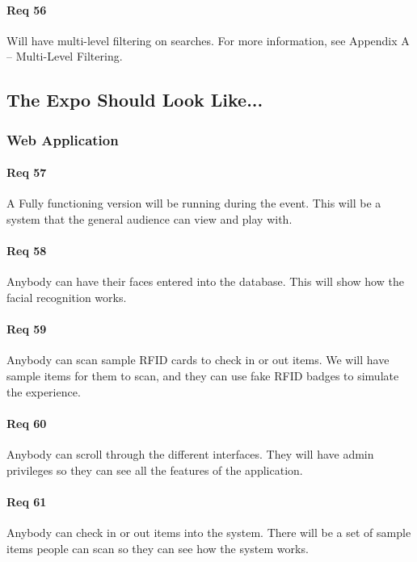 \documentclass[10pt, onecolumn, twoside, peerreview]{IEEEtran}
\begin{document}
\paragraph*{Req 56} Will have multi-level filtering on searches. For more information, see Appendix A – Multi-Level Filtering.\\

\subsection{The Expo Should Look Like...}
\subsubsection{Web Application}
\paragraph*{Req 57} A Fully functioning version will be running during the event. This will be a system that the general audience can view
and play with.\\

\paragraph*{Req 58} Anybody can have their faces entered into the database. This will show how the facial recognition works.\\

\paragraph*{Req 59} Anybody can scan sample RFID cards to check in or out items. We will have sample items for them to scan, and they can
use fake RFID badges to simulate the experience.\\

\paragraph*{Req 60} Anybody can scroll through the different interfaces. They will have admin privileges so they can see all the features
of the application.\\

\paragraph*{Req 61} Anybody can check in or out items into the system. There will be a set of sample items people can scan so they can see
how the system works.\\
\end{document}
